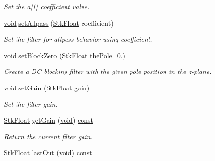 \begin{DoxyCompactItemize}
\begin{DoxyCompactList}\small\item\em Set the a\mbox{[}1\mbox{]} coefficient value. \end{DoxyCompactList}\item 
\hyperlink{sound_8c_ae35f5844602719cf66324f4de2a658b3}{void} \hyperlink{class_nyq_1_1_pole_zero_ac4492b4e8872b76e94364ef0c5b484fc}{set\+Allpass} (\hyperlink{namespace_nyq_a044fa20a706520a617bbbf458a7db7e4}{Stk\+Float} coefficient)
\begin{DoxyCompactList}\small\item\em Set the filter for allpass behavior using {\itshape coefficient}. \end{DoxyCompactList}\item 
\hyperlink{sound_8c_ae35f5844602719cf66324f4de2a658b3}{void} \hyperlink{class_nyq_1_1_pole_zero_ab1c4c6d158e848e0dafa780decce4704}{set\+Block\+Zero} (\hyperlink{namespace_nyq_a044fa20a706520a617bbbf458a7db7e4}{Stk\+Float} the\+Pole=0.)
\begin{DoxyCompactList}\small\item\em Create a DC blocking filter with the given pole position in the z-\/plane. \end{DoxyCompactList}\item 
\hyperlink{sound_8c_ae35f5844602719cf66324f4de2a658b3}{void} \hyperlink{class_nyq_1_1_pole_zero_a71fa7fc527cd04136ace28d6cf8576e5}{set\+Gain} (\hyperlink{namespace_nyq_a044fa20a706520a617bbbf458a7db7e4}{Stk\+Float} gain)
\begin{DoxyCompactList}\small\item\em Set the filter gain. \end{DoxyCompactList}\item 
\hyperlink{namespace_nyq_a044fa20a706520a617bbbf458a7db7e4}{Stk\+Float} \hyperlink{class_nyq_1_1_pole_zero_af2762c1d6f549db8c85296f8ad40eb7a}{get\+Gain} (\hyperlink{sound_8c_ae35f5844602719cf66324f4de2a658b3}{void}) \hyperlink{getopt1_8c_a2c212835823e3c54a8ab6d95c652660e}{const} 
\begin{DoxyCompactList}\small\item\em Return the current filter gain. \end{DoxyCompactList}\item 
\hyperlink{namespace_nyq_a044fa20a706520a617bbbf458a7db7e4}{Stk\+Float} \hyperlink{class_nyq_1_1_pole_zero_ad717b0231ae05209c7c76562fc737f04}{last\+Out} (\hyperlink{sound_8c_ae35f5844602719cf66324f4de2a658b3}{void}) \hyperlink{getopt1_8c_a2c212835823e3c54a8ab6d95c652660e}{const} 

\end{DoxyCompactItemize}
